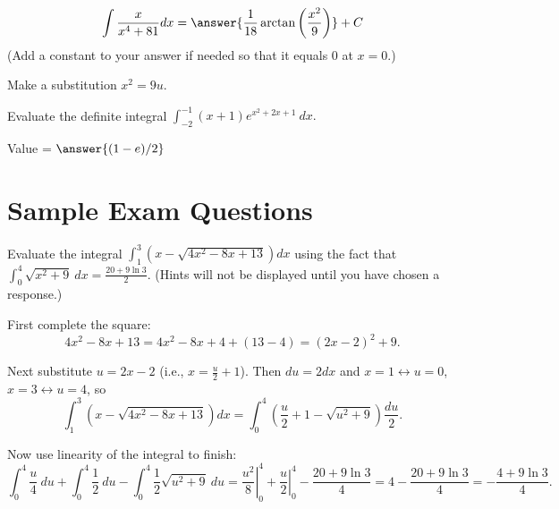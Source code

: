 \documentclass{ximera}
\begin{document}
\begin{exercise}%
\[ \int \frac{x}{x^4+81} dx = \answer{\frac{1}{18} \arctan \left(\frac{x^2}{9}\right)}+C \]
(Add a constant to your answer if needed so that it equals $0$ at $x = 0$.)
\begin{hint}
Make a substitution $x^2 = 9 u$.
\end{hint}
%
%
\end{exercise}

\begin{exercise}%
Evaluate the definite integral \(\displaystyle \int_{-2}^{-1} (x+1)e^{x^2+2x+1}\ dx. \)
\begin{center}
\begin{prompt}
Value = \(\answer{(1-e)/2}\)
\end{prompt}
\end{center}
%
%
\end{exercise}

\section*{Sample Exam Questions}

\begin{question}%
Evaluate the integral $\displaystyle \int_1^3 \left( x - \sqrt{4 x^2 - 8 x + 13} \right)  dx$ using the fact that $\displaystyle \int_0^4 \sqrt{x^2 + 9} ~ dx =  \frac{20 + 9 \ln 3}{2}$.
(Hints will not be displayed until you have chosen a response.)
\begin{multiplechoice}
\end{multiplechoice}
\begin{feedback}
First complete the square:
\[ 4 x^2 - 8 x + 13 = 4 x^2 - 8 x + 4 + (13 - 4) = (2x - 2)^2 + 9. \] \begin{hint} 
Next substitute $u = 2x-2$ (i.e., $x = \frac{u}{2} + 1$). Then $du = 2 dx$ and $x=1 \leftrightarrow u = 0$, $x=3 \leftrightarrow u = 4$, so
\[ \int_1^3 \left( x - \sqrt{4x^2 - 8x + 13} \right) dx = \int_0^4 \left( \frac{u}{2} + 1 - \sqrt{u^2 + 9} \right) \frac{du}{2}. \] \begin{hint}
Now use linearity of the integral to finish:
\[ \int_0^4 \frac{u}{4} ~ du + \int_0^4 \frac{1}{2} ~ du - \int_0^4 \frac{1}{2} \sqrt{u^2+9} ~ du = \left. \frac{u^2}{8} \right|_0^4 + \left. \frac{u}{2} \right|_0^4 - \frac{20 + 9 \ln 3}{4} = 4 - \frac{20+9 \ln 3}{4} = - \frac{4 + 9 \ln 3}{4}.\] \end{hint}\end{hint}
\end{feedback}
\end{question}
\end{document}
